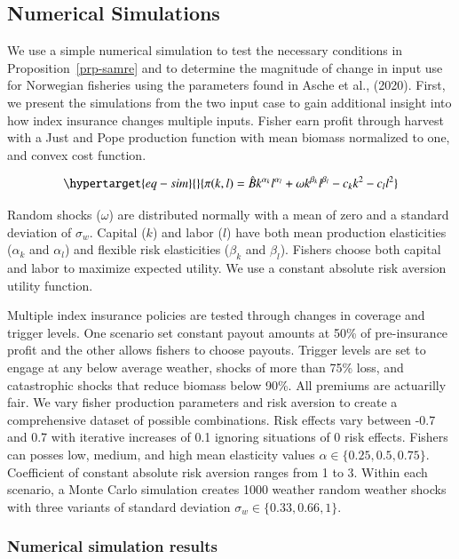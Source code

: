 \documentclass[
  super,
  preprint,
  3p]{elsarticle}
\theoremstyle{plain}
\theoremstyle{plain}
\theoremstyle{remark}
\begin{document}
\hypertarget{sec-sim}{%
\subsection{Numerical Simulations}\label{sec-sim}}

We use a simple numerical simulation to test the necessary conditions in
Proposition~\ref{prp-samre} and to determine the magnitude of change in
input use for Norwegian fisheries using the parameters found in Asche et
al., (2020). First, we present the simulations from the two input case
to gain additional insight into how index insurance changes multiple
inputs. Fisher earn profit through harvest with a Just and Pope
production function with mean biomass normalized to one, and convex cost
function.

\begin{equation}\protect\hypertarget{eq-sim}{}{
\pi(k,l)=\hat{B}k^{\alpha_k}l^{\alpha_l}+\omega k^{\beta_k}l^{\beta_l}-c_kk^2-c_ll^2
}\label{eq-sim}\end{equation}

Random shocks (\(\omega\)) are distributed normally with a mean of zero
and a standard deviation of \(\sigma_w\). Capital (\(k\)) and labor
(\(l\)) have both mean production elasticities (\(\alpha_k\) and
\(\alpha_l\)) and flexible risk elasticities (\(\beta_k\) and
\(\beta_l\)). Fishers choose both capital and labor to maximize expected
utility. We use a constant absolute risk aversion utility function.

Multiple index insurance policies are tested through changes in coverage
and trigger levels. One scenario set constant payout amounts at 50\% of
pre-insurance profit and the other allows fishers to choose payouts.
Trigger levels are set to engage at any below average weather, shocks of
more than 75\% loss, and catastrophic shocks that reduce biomass below
90\%. All premiums are actuarilly fair. We vary fisher production
parameters and risk aversion to create a comprehensive dataset of
possible combinations. Risk effects vary between -0.7 and 0.7 with
iterative increases of 0.1 ignoring situations of 0 risk effects.
Fishers can posses low, medium, and high mean elasticity values
\(\alpha\in\{0.25,0.5,0.75\}\). Coefficient of constant absolute risk
aversion ranges from 1 to 3. Within each scenario, a Monte Carlo
simulation creates 1000 weather random weather shocks with three
variants of standard deviation \(\sigma_w\in\{0.33,0.66,1\}\).

\hypertarget{numerical-simulation-results}{%
\subsubsection{Numerical simulation
results}\label{numerical-simulation-results}}
\end{document}
